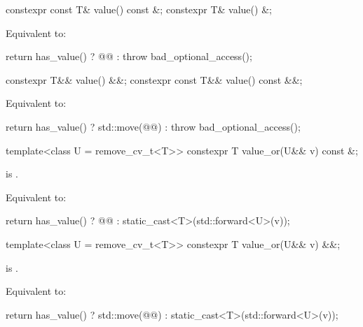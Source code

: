 %
\begin{itemdecl}
constexpr const T& value() const &;
constexpr T& value() &;
\end{itemdecl}

\begin{itemdescr}
\pnum
\effects
Equivalent to:
\begin{codeblock}
return has_value() ? @@ : throw bad_optional_access();
\end{codeblock}
\end{itemdescr}

%
\begin{itemdecl}
constexpr T&& value() &&;
constexpr const T&& value() const &&;
\end{itemdecl}

\begin{itemdescr}

\pnum
\effects
Equivalent to:
\begin{codeblock}
return has_value() ? std::move(@@) : throw bad_optional_access();
\end{codeblock}
\end{itemdescr}

%
\begin{itemdecl}
template<class U = remove_cv_t<T>> constexpr T value_or(U&& v) const &;
\end{itemdecl}

\begin{itemdescr}
\pnum
\mandates
{} is .

\pnum
\effects
Equivalent to:
\begin{codeblock}
return has_value() ? @@ : static_cast<T>(std::forward<U>(v));
\end{codeblock}
\end{itemdescr}

%
\begin{itemdecl}
template<class U = remove_cv_t<T>> constexpr T value_or(U&& v) &&;
\end{itemdecl}

\begin{itemdescr}
\pnum
\mandates
{} is .

\pnum
\effects
Equivalent to:
\begin{codeblock}
return has_value() ? std::move(@@) : static_cast<T>(std::forward<U>(v));
\end{codeblock}
\end{itemdescr}

